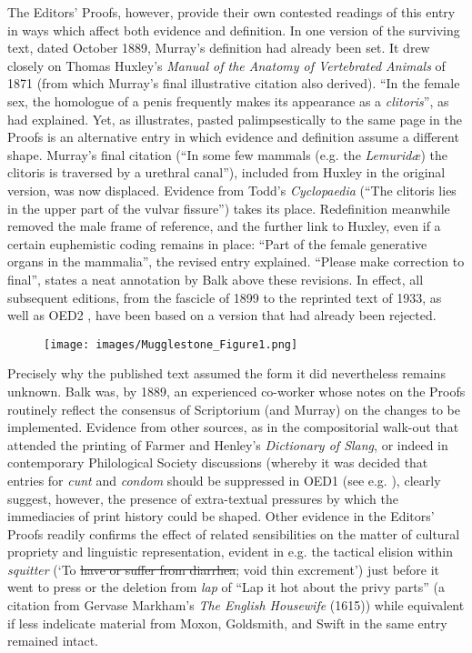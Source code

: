 \documentclass[output=paper,colorlinks,citecolor=brown,arabicfont,chinesefont]{langscibook}
\begin{document}
The Editors’ Proofs, however, provide their own contested readings of this entry in ways which affect both evidence and definition. In one version of the surviving text, dated October 1889,  Murray’s definition had already been set. It drew closely on Thomas Huxley’s \emph{Manual of the Anatomy of Vertebrated Animals} of 1871 (from which Murray’s final illustrative citation also derived). “In the female sex, the homologue of a penis frequently makes its appearance as a \emph{clitoris}”, as \citet[111]{Huxley1871} had explained. Yet, as  illustrates, pasted palimpsestically to the same page in the Proofs is an alternative entry in which evidence and definition assume a different shape. Murray’s final citation (“In some few mammals (e.g. the \emph{Lemuridæ}) the clitoris is traversed by a urethral canal”), included from Huxley in the original version, was now displaced.  Evidence from Todd’s \emph{Cyclopaedia} (“The clitoris lies in the upper part of the vulvar fissure”) takes its place. Redefinition meanwhile removed the male frame of reference, and the further link to Huxley, even if a certain euphemistic coding remains in place: “Part of the female generative organs in the mammalia”, the revised entry explained. “Please make correction to final”, states a neat annotation by Balk above these revisions. In effect, all subsequent editions, from the fascicle of 1899 to the reprinted text of 1933, as well as OED2 \citep{Simpson1989}, have been based on a version that had already been rejected.

\begin{figure}
\texttt{[image: images/Mugglestone\_Figure1.png]}
\label{fig:muggle:1}
\end{figure}

Precisely why the published text assumed the form it did nevertheless remains unknown. Balk was, by 1889, an experienced co-worker whose notes on the Proofs routinely reflect the consensus of Scriptorium (and Murray) on the changes to be implemented.  Evidence from other sources, as in the compositorial walk-out that attended the printing of Farmer and Henley’s \emph{Dictionary of Slang}, or indeed in contemporary Philological Society discussions (whereby it was decided that entries for \emph{cunt} and \emph{condom} should be suppressed in OED1 (see e.g. \citealt[1--22]{Mugglestone2007}), clearly suggest, however, the presence of extra-textual pressures by which the immediacies of print history could be shaped. Other evidence in the Editors’ Proofs readily confirms the effect of related sensibilities on the matter of cultural propriety and linguistic representation, evident in e.g. the tactical elision within \emph{squitter} (`To \sout{have or suffer from diarrhea}; void thin excrement’) just before it went to press or the deletion from \emph{lap} of “Lap it hot about the privy parts” (a citation from Gervase Markham’s \emph{The English Housewife} (1615)) while equivalent if less indelicate material from Moxon, Goldsmith, and Swift in the same entry remained intact.
\end{document}

